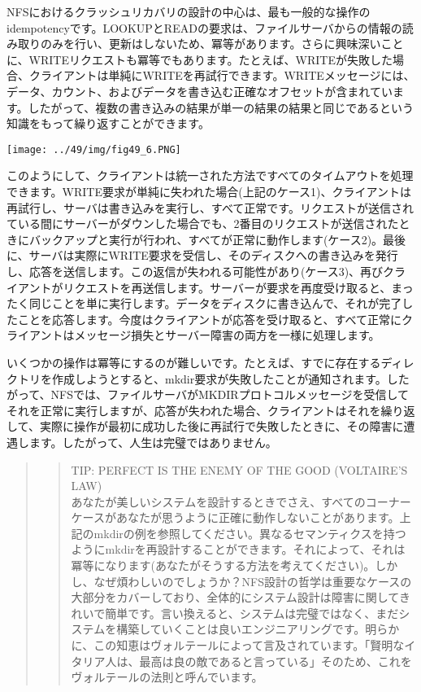 NFSにおけるクラッシュリカバリの設計の中心は、最も一般的な操作のidempotencyです。LOOKUPとREADの要求は、ファイルサーバからの情報の読み取りのみを行い、更新はしないため、冪等があります。さらに興味深いことに、WRITEリクエストも冪等でもあります。たとえば、WRITEが失敗した場合、クライアントは単純にWRITEを再試行できます。WRITEメッセージには、データ、カウント、およびデータを書き込む正確なオフセットが含まれています。したがって、複数の書き込みの結果が単一の結果の結果と同じであるという知識をもって繰り返すことができます。

\texttt{[image: ../49/img/fig49\_6.PNG]}

このようにして、クライアントは統一された方法ですべてのタイムアウトを処理できます。WRITE要求が単純に失われた場合(上記のケース1)、クライアントは再試行し、サーバは書き込みを実行し、すべて正常です。リクエストが送信されている間にサーバーがダウンした場合でも、2番目のリクエストが送信されたときにバックアップと実行が行われ、すべてが正常に動作します(ケース2)。最後に、サーバは実際にWRITE要求を受信し、そのディスクへの書き込みを発行し、応答を送信します。この返信が失われる可能性があり(ケース3)、再びクライアントがリクエストを再送信します。サーバーが要求を再度受け取ると、まったく同じことを単に実行します。データをディスクに書き込んで、それが完了したことを応答します。今度はクライアントが応答を受け取ると、すべて正常にクライアントはメッセージ損失とサーバー障害の両方を一様に処理します。

いくつかの操作は冪等にするのが難しいです。たとえば、すでに存在するディレクトリを作成しようとすると、mkdir要求が失敗したことが通知されます。したがって、NFSでは、ファイルサーバがMKDIRプロトコルメッセージを受信してそれを正常に実行しますが、応答が失われた場合、クライアントはそれを繰り返して、実際に操作が最初に成功した後に再試行で失敗したときに、その障害に遭遇します。したがって、人生は完璧ではありません。

\begin{quote}
\begin{quote}
TIP: PERFECT IS THE ENEMY OF THE GOOD (VOLTAIRE'S LAW)\\
あなたが美しいシステムを設計するときでさえ、すべてのコーナーケースがあなたが思うように正確に動作しないことがあります。上記のmkdirの例を参照してください。異なるセマンティクスを持つようにmkdirを再設計することができます。それによって、それは冪等になります(あなたがそうする方法を考えてください)。しかし、なぜ煩わしいのでしょうか？NFS設計の哲学は重要なケースの大部分をカバーしており、全体的にシステム設計は障害に関してきれいで簡単です。言い換えると、システムは完璧ではなく、まだシステムを構築していくことは良いエンジニアリングです。明らかに、この知恵はヴォルテールによって言及されています。「賢明なイタリア人は、最高は良の敵であると言っている」そのため、これをヴォルテールの法則と呼んでいます。
\end{quote}
\end{quote}

